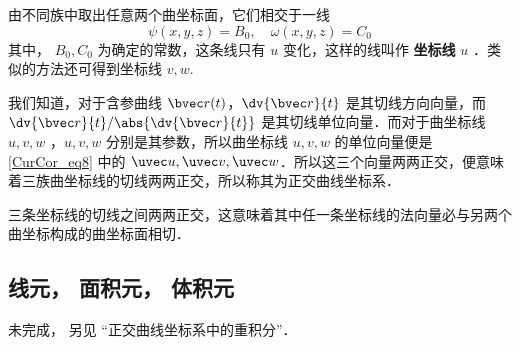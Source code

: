 由不同族中取出任意两个曲坐标面，它们相交于一线
\begin{equation}
\psi(x,y,z)=B_0,\quad \omega(x,y,z)=C_0
\end{equation}
其中， $B_0,C_0$ 为确定的常数，这条线只有 $u$ 变化，这样的线叫作 \textbf{坐标线} $u$ ．类似的方法还可得到坐标线 $v,w$.

我们知道，对于含参曲线 $\bvec r(t)$，$\dv{\bvec r}{t}$ 是其切线方向向量，而 $\dv{\bvec r}{t}/\abs{\dv{\bvec r}{t}}$ 是其切线单位向量．而对于曲坐标线 $u,v,w$ ，$u,v,w$ 分别是其参数，所以曲坐标线 $u,v,w$ 的单位向量便是\autoref{CurCor_eq8} 中的 $\uvec u,\uvec v,\uvec w$．所以这三个向量两两正交，便意味着三族曲坐标线的切线两两正交，所以称其为正交曲线坐标系．

三条坐标线的切线之间两两正交，这意味着其中任一条坐标线的法向量必与另两个曲坐标构成的曲坐标面相切．

\subsection{线元， 面积元， 体积元}
未完成， 另见 “正交曲线坐标系中的重积分”．
